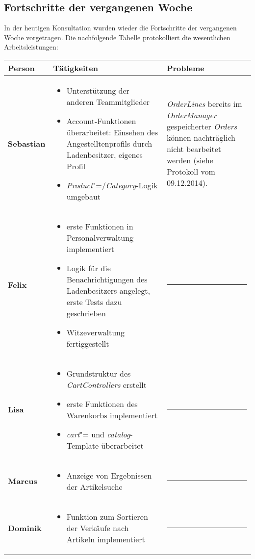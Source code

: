 \documentclass{scrartcl}
\begin{document}
\subsection{Fortschritte der vergangenen Woche}
In der heutigen Konsultation wurden wieder die Fortschritte der vergangenen Woche vorgetragen. Die nachfolgende Tabelle protokolliert die wesentlichen Arbeitsleistungen:\\[.4cm]
\renewcommand{\arraystretch}{2}
\begin{tabularx}{\textwidth}{p{}p{}X}
\hline
\textsf{\textbf{\large Person}} & \textsf{\textbf{\large Tätigkeiten}} & \textsf{\textbf{\large Probleme}} \\
\hline\hline
\textbf{Sebastian} & 
 \begin{itemize}
 \item Unterstützung der anderen Teammitglieder
  \item Account-Funktionen überarbeitet: Einsehen des Angestelltenprofils durch Ladenbesitzer, eigenes Profil
  \item \textit{Product}"=/\textit{Category}-Logik umgebaut
 \end{itemize}
 & \textit{OrderLines} bereits im \textit{OrderManager} gespeicherter \textit{Orders} können nachträglich nicht bearbeitet werden (siehe Protokoll vom 09.12.2014). \\ \hline
\textbf{Felix} & 
 \begin{itemize}
 \item erste Funktionen in Personalverwaltung implementiert
 \item Logik für die Benachrichtigungen des Ladenbesitzers angelegt, erste Tests dazu geschrieben
 \item Witzeverwaltung fertiggestellt
 \end{itemize}
 & \rule[1ex]{.7cm}{1pt} \\ \hline
\textbf{Lisa} & 
 \begin{itemize}
 \item Grundstruktur des \textit{CartControllers} erstellt
 \item erste Funktionen des Warenkorbs implementiert
 \item \textit{cart}"= und \textit{catalog}-Template überarbeitet
 \end{itemize}
& \rule[1ex]{.7cm}{1pt} \\ \hline
\textbf{Marcus} & 
 \begin{itemize}
 \item Anzeige von Ergebnissen der Artikelsuche
 \end{itemize}
& \rule[1ex]{.7cm}{1pt} \\ \hline
\textbf{Dominik} &
 \begin{itemize}
 \item Funktion zum Sortieren der Verkäufe nach Artikeln implementiert
 \end{itemize}
& \rule[1ex]{.7cm}{1pt} \\ \hline
\end{tabularx}\\
\end{document}
